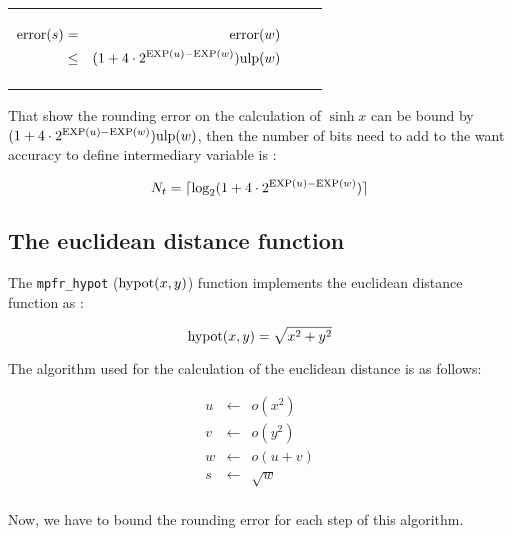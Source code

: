 \documentclass[12pt]{amsart}
\def\ulp{{\rm ulp}}
\def\exp{{\rm EXP}}
\begin{document}
\begin{center}
\begin{tabular}{l|l |l}
\begin{minipage}{7.5cm}
\begin{center}
\begin{eqnarray}\nonumber
 {\textnormal{error}}(s) & = &  {\textnormal{error}}(w)\\\nonumber
 & \leq &  (1+ 4 \cdot 2^{\exp(u)-\exp(w)}) \ulp(w)
\end{eqnarray}



\end{center}

\end{minipage} &
\begin{minipage}{6cm}


\end{minipage}


\end{tabular}
\end{center}


That show the rounding error on the calculation of $\sinh x$ can be bound by $(1+ 4 \cdot 2^{\exp(u)-\exp(w)}) \ulp(w)$, then the number of bits need to add to the want accuracy to define intermediary variable is :

\[
N_t=\lceil \log_2(1+ 4 \cdot 2^{\exp(u)-\exp(w)}) \rceil
\]



\subsection{The euclidean distance function}

The {\tt mpfr\_hypot} ($\textnormal{hypot}(x,y)$) function implements the euclidean distance function  as :

\[
\textnormal{hypot} (x,y) = \sqrt{x^2+y^2}
\]

The algorithm used for the calculation of the euclidean distance is as follows:

\begin{eqnarray}\nonumber
u&\leftarrow&o(x^2)\\\label{hypotalgo1}
v&\leftarrow&o({y}^{2})\\\label{hypotalgo2}
w&\leftarrow&o(u+v)\\\label{hypotalgo3}
s&\leftarrow&\sqrt{w}\\\label{hypotalgo4}
\end{eqnarray}

Now, we have to bound the rounding error for each step of this
algorithm.  
\end{document}
